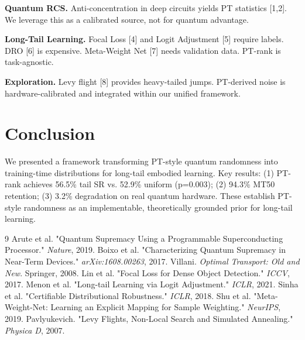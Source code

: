 \documentclass[10pt,twocolumn]{article}
\begin{document}
\textbf{Quantum RCS.} Anti-concentration in deep circuits yields PT statistics [1,2]. We leverage this as a calibrated source, not for quantum advantage.

\textbf{Long-Tail Learning.} Focal Loss [4] and Logit Adjustment [5] require labels. DRO [6] is expensive. Meta-Weight Net [7] needs validation data. PT-rank is task-agnostic.

\textbf{Exploration.} Levy flight [8] provides heavy-tailed jumps. PT-derived noise is hardware-calibrated and integrated within our unified framework.

\section{Conclusion}

We presented a framework transforming PT-style quantum randomness into training-time distributions for long-tail embodied learning. Key results: (1) PT-rank achieves 56.5\% tail SR vs. 52.9\% uniform (p=0.003); (2) 94.3\% MT50 retention; (3) 3.2\% degradation on real quantum hardware. These establish PT-style randomness as an implementable, theoretically grounded prior for long-tail learning.

\begin{thebibliography}{9}
 Arute et al. "Quantum Supremacy Using a Programmable Superconducting Processor." \textit{Nature}, 2019.
 Boixo et al. "Characterizing Quantum Supremacy in Near-Term Devices." \textit{arXiv:1608.00263}, 2017.
 Villani. \textit{Optimal Transport: Old and New}. Springer, 2008.
 Lin et al. "Focal Loss for Dense Object Detection." \textit{ICCV}, 2017.
 Menon et al. "Long-tail Learning via Logit Adjustment." \textit{ICLR}, 2021.
 Sinha et al. "Certifiable Distributional Robustness." \textit{ICLR}, 2018.
 Shu et al. "Meta-Weight-Net: Learning an Explicit Mapping for Sample Weighting." \textit{NeurIPS}, 2019.
 Pavlyukevich. "Levy Flights, Non-Local Search and Simulated Annealing." \textit{Physica D}, 2007.
\end{thebibliography}
\end{document}
